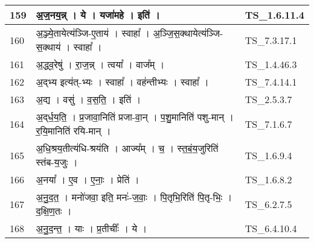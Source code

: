 \documentclass[17pt]{extarticle}
\begin{document}
\begin{longtable}{||p{0.4in}||p{4.9in}||p{0.9in}||}
    \hline
        
    159 & अ॒ज॒नय॒न्न्   ।   ये   ।   यजा॑महे   ।   इति॑   ।    & TS\_1.6.11.4       \\
    
    \hline
        
    160 & अ॒ञ्ज्ये॒तायेत्य॑ञ्जि{-}ए॒ताय॑   ।   स्वाहा᳚   ।   अ॒ञ्जि॒स॒क्थायेत्य॑ञ्जि{-}स॒क्थाय॑   ।   स्वाहा᳚   ।    & TS\_7.3.17.1       \\
    
    \hline
        
    161 & अ॒द्ध्व॒रेषु॑   ।   रा॒ज॒न्न्   ।   त्वया᳚   ।   वाज᳚म्   ।    & TS\_1.4.46.3       \\
    
    \hline
        
    162 & अ॒द्भ्य इत्य॑त्{-}भ्यः   ।   स्वाहा᳚   ।   वह॑न्तीभ्यः   ।   स्वाहा᳚   ।    & TS\_7.4.14.1       \\
    
    \hline
        
    163 & अ॒द्य   ।   वसु॑   ।   व॒स॒ति॒   ।   इति॑   ।    & TS\_2.5.3.7       \\
    
    \hline
        
    164 & अ॒द्‌र्ध॒य॒ति॒   ।   प्र॒जावा॒निति॑ प्रजा{-}वा॒न्   ।   प॒शु॒मानिति॑ पशु{-}मान्   ।   र॒यि॒मानिति॑ रयि{-}मान्   ।    & TS\_7.1.6.7       \\
    
    \hline
        
    165 & अ॒धि॒श्रय॒तीत्य॑धि{-}श्रय॑ति   ।   आज्य᳚म्   ।   च॒   ।   स्त॒बं॒य॒जुरिति॑ स्तंब{-}य॒जुः   ।    & TS\_1.6.9.4       \\
    
    \hline
        
    166 & अ॒नया᳚   ।   ए॒व   ।   ए॒नाः॒   ।   प्रेति॑   ।    & TS\_1.6.8.2       \\
    
    \hline
        
    167 & अ॒नु॒द॒त॒   ।   मनो॑जवा॒ इति॒ मनः॑{-}ज॒वाः॒   ।   पि॒तृभि॒रिति॑ पि॒तृ{-}भिः॒   ।   द॒क्षि॒ण॒तः   ।    & TS\_6.2.7.5       \\
    
    \hline
        
    168 & अ॒नु॒द॒न्त॒   ।   याः   ।   प्र॒तीचीः᳚   ।   ये   ।    & TS\_6.4.10.4       \\
    
    \hline
        

\end{longtable}
\end{document}
